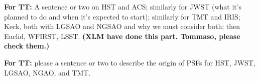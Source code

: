 \documentclass[a4paper,11pt]{article}
\begin{document}
\textbf{For TT:} A sentence or two on HST and ACS; similarly for JWST (what it's planned to do and when it's expected to start); similarly for TMT and IRIS; Keck, both with LGSAO and NGSAO and why we must consider both; then Euclid, WFIRST, LSST. \textbf{(XLM have done this part. Tommaso, please check them.)}

\textbf{For TT:} please a sentence or two to describe the origin of PSFs for HST, JWST, LGSAO, NGAO, and TMT.



\end{document}

